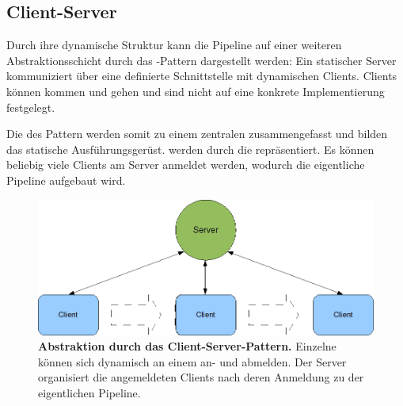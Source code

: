 \subsection{Client-Server}
Durch ihre dynamische Struktur kann die Pipeline auf einer weiteren
Abstraktionsschicht durch das -Pattern dargestellt werden:
Ein statischer Server kommuniziert über eine definierte Schnittstelle mit
dynamischen Clients.
Clients können kommen und gehen und sind nicht auf eine konkrete
Implementierung festgelegt. 

Die  des  Pattern werden somit zu einem
zentralen  zusammengefasst und bilden das statische
Ausführungsgerüst.
 werden durch die  repräsentiert.  Es können beliebig viele Clients am Server anmeldet werden, wodurch
die eigentliche Pipeline aufgebaut wird.

\begin{figure}[htbp]
	\begin{center}
		\includegraphics[scale=0.6]{pics/serverClient2.png}
	\caption[Client Server]{
	\textbf{Abstraktion durch das Client-Server-Pattern.}
	Einzelne  können sich
	dynamisch an einem  an- und abmelden. Der Server organisiert die
	angemeldeten Clients nach deren Anmeldung zu der eigentlichen Pipeline.}
	\end{center}
	\label{fig:clientServer2}
\end{figure}

